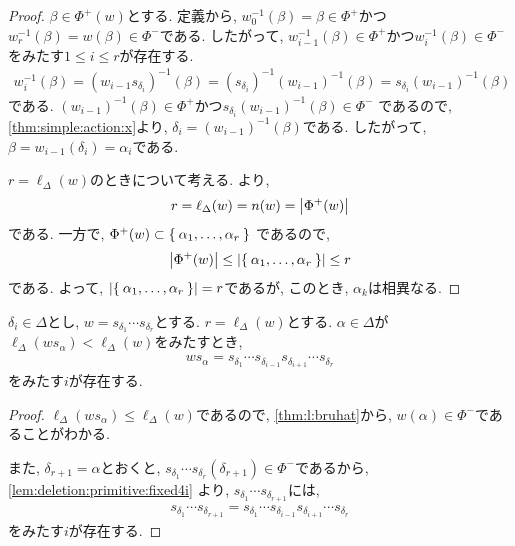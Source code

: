 \begin{proof}
  $\beta\in\Phi^+(w)$とする.
  定義から,
  $w_{0}^{-1}(\beta)=\beta\in\Phi^+$かつ$w_r^{-1}(\beta)=w(\beta)\in\Phi^-$である.
  したがって, $w_{i-1}^{-1}(\beta)\in \Phi^+$かつ$w_{i}^{-1}(\beta)\in \Phi^-$
  をみたす$1\leq i\leq r$が存在する.
  \begin{align*}
    w_{i}^{-1}(\beta)=(w_{i-1}s_{\delta_i})^{-1}(\beta)
    =(s_{\delta_i})^{-1}(w_{i-1})^{-1}(\beta)
    =s_{\delta_i}(w_{i-1})^{-1}(\beta)
  \end{align*}
  である.
  $(w_{i-1})^{-1}(\beta)\in \Phi^+$かつ$s_{\delta_i}(w_{i-1})^{-1}(\beta)\in\Phi^-$
  であるので,
  \cref{thm:simple:action:x}より,
  $\delta_i=(w_{i-1})^{-1}(\beta)$である.
  したがって,
  $\beta=w_{i-1}(\delta_i)=\alpha_i$である.

  
  $r=\ell_\Delta(w)$のときについて考える.
  より,
  \begin{align*}
    r=\ell_\Delta(w)=n(w)=\left|\Phi^+(w)\right|
  \end{align*}
  である.
  一方で, $\Phi^+(w)\subset \Set{\alpha_1,\ldots,\alpha_r}$
  であるので,
  \begin{align*}
    \left|\Phi^+(w)\right|\leq \left|\Set{\alpha_1,\ldots,\alpha_r}\right|\leq r
  \end{align*}
  である.
  よって,
  $\left|\Set{\alpha_1,\ldots,\alpha_r}\right|=r$であるが,
  このとき, $\alpha_k$は相異なる.

\end{proof}


\begin{prop}
  $\delta_i\in \Delta$とし, $w=s_{\delta_1}\cdots s_{\delta_r}$とする.
  $r=\ell_\Delta(w)$とする.
  $\alpha\in \Delta$が$\ell_\Delta(ws_\alpha)< \ell_\Delta(w)$をみたすとき,
  \begin{align*}
    ws_\alpha=s_{\delta_1}\cdots s_{\delta_{i-1}}s_{\delta_{i+1}}\cdots s_{\delta_{r}}
  \end{align*}
  をみたす$i$が存在する.
\end{prop}
\begin{proof}
  $\ell_\Delta(ws_\alpha)\leq \ell_\Delta(w)$であるので,
  \cref{thm:l:bruhat}から, $w(\alpha)\in\Phi^-$であることがわかる.

  また, $\delta_{r+1}=\alpha$とおくと,
  $s_{\delta_{1}}\cdots s_{\delta_{r}}(\delta_{r+1})\in \Phi^-$であるから,
  \cref{lem:deletion:primitive:fixed4i}
  より, $s_{\delta_{1}}\cdots s_{\delta_{r+1}}$には,
  \begin{align*}
    s_{\delta_{1}}\cdots s_{\delta_{r+1}}
    =s_{\delta_{1}}\cdots s_{\delta_{i-1}}
    s_{\delta_{i+1}}\cdots s_{\delta_{r}}
  \end{align*}
  をみたす$i$が存在する.
\end{proof}

